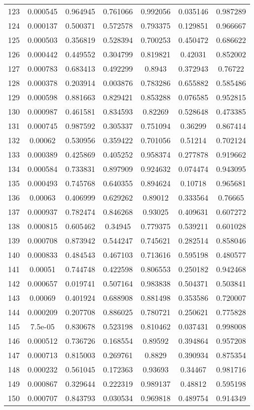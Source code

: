 \begin{table}
\begin{tabular}{c|c|c|c|c|c|c}
123 & 0.000545 & 0.964945 & 0.761066 & 0.992056 & 0.035146 & 0.987289\\
124 & 0.000137 & 0.500371 & 0.572578 & 0.793375 & 0.129851 & 0.966667\\
125 & 0.000503 & 0.356819 & 0.528394 & 0.700253 & 0.450472 & 0.686622\\
126 & 0.000442 & 0.449552 & 0.304799 & 0.819821 & 0.42031 & 0.852002\\
127 & 0.000783 & 0.683413 & 0.492299 & 0.8943 & 0.372943 & 0.76722\\
128 & 0.000378 & 0.203914 & 0.003876 & 0.783286 & 0.655882 & 0.585486\\
129 & 0.000598 & 0.881663 & 0.829421 & 0.853288 & 0.076585 & 0.952815\\
130 & 0.000987 & 0.461581 & 0.834593 & 0.82269 & 0.528648 & 0.473385\\
131 & 0.000745 & 0.987592 & 0.305337 & 0.751094 & 0.36299 & 0.867414\\
132 & 0.00062 & 0.530956 & 0.359422 & 0.701056 & 0.51214 & 0.702124\\
133 & 0.000389 & 0.425869 & 0.405252 & 0.958374 & 0.277878 & 0.919662\\
134 & 0.000584 & 0.733831 & 0.897909 & 0.924632 & 0.074474 & 0.943095\\
135 & 0.000493 & 0.745768 & 0.640355 & 0.894624 & 0.10718 & 0.965681\\
136 & 0.00063 & 0.406999 & 0.629262 & 0.89012 & 0.333564 & 0.76665\\
137 & 0.000937 & 0.782474 & 0.846268 & 0.93025 & 0.409631 & 0.607272\\
138 & 0.000815 & 0.605462 & 0.34945 & 0.779375 & 0.539211 & 0.601028\\
139 & 0.000708 & 0.873942 & 0.544247 & 0.745621 & 0.282514 & 0.858046\\
140 & 0.000833 & 0.484543 & 0.467103 & 0.713616 & 0.595198 & 0.480577\\
141 & 0.00051 & 0.744748 & 0.422598 & 0.806553 & 0.250182 & 0.942468\\
142 & 0.000657 & 0.019741 & 0.507164 & 0.983838 & 0.504371 & 0.503841\\
143 & 0.00069 & 0.401924 & 0.688908 & 0.881498 & 0.353586 & 0.720007\\
144 & 0.000209 & 0.207708 & 0.886025 & 0.780721 & 0.250621 & 0.775828\\
145 & 7.5e-05 & 0.830678 & 0.523198 & 0.810462 & 0.037431 & 0.998008\\
146 & 0.000512 & 0.736726 & 0.168554 & 0.89592 & 0.394864 & 0.957208\\
147 & 0.000713 & 0.815003 & 0.269761 & 0.8829 & 0.390934 & 0.875354\\
148 & 0.000232 & 0.561045 & 0.172363 & 0.93693 & 0.34467 & 0.981716\\
149 & 0.000867 & 0.329644 & 0.222319 & 0.989137 & 0.48812 & 0.595198\\
150 & 0.000707 & 0.843793 & 0.030534 & 0.969818 & 0.489754 & 0.914349\\
\end{tabular}
\end{table}
